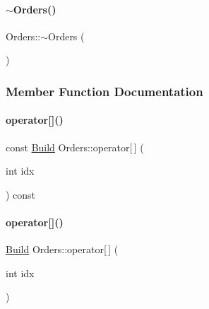 \paragraph{\texorpdfstring{$\sim$Orders()}{~Orders()}}
{\footnotesize\ttfamily Orders\+::$\sim$\+Orders (\begin{DoxyParamCaption}{ }\end{DoxyParamCaption})\hspace{0.3cm}{\ttfamily [inline]}}



\subsubsection{Member Function Documentation}
\mbox{\label{class_orders_a9574f4521c39b8a8d7cdfd1f28b07ffb}} 
\paragraph{\texorpdfstring{operator[]()}{operator[]()}\hspace{0.1cm}{\footnotesize\ttfamily [1/2]}}
{\footnotesize\ttfamily const \mbox{\hyperlink{class_build}{Build}} Orders\+::operator\mbox{[}$\,$\mbox{]} (\begin{DoxyParamCaption}\item[{int}]{idx }\end{DoxyParamCaption}) const\hspace{0.3cm}{\ttfamily [inline]}}

\mbox{\label{class_orders_abae5fb4a0e7dfa2c222215850531d695}} 
\paragraph{\texorpdfstring{operator[]()}{operator[]()}\hspace{0.1cm}{\footnotesize\ttfamily [2/2]}}
{\footnotesize\ttfamily \mbox{\hyperlink{class_build}{Build}} Orders\+::operator\mbox{[}$\,$\mbox{]} (\begin{DoxyParamCaption}\item[{int}]{idx }\end{DoxyParamCaption})\hspace{0.3cm}{\ttfamily [inline]}}

\mbox{\label{class_orders_a678969b0e57fd41f4ab0cc949d4500f6}} 
